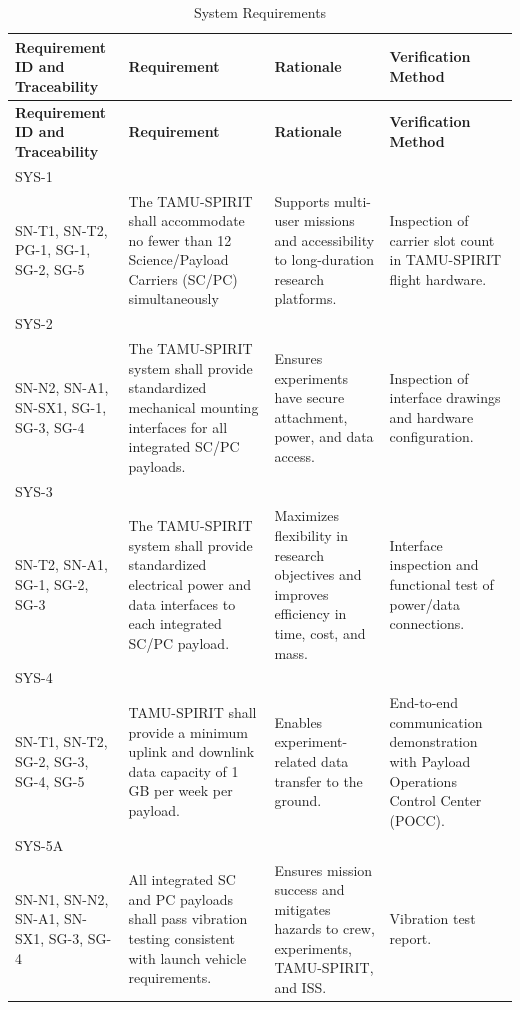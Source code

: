 \documentclass[conf]{new-aiaa}
\begin{document}
{\footnotesize
\setlength{\tabcolsep}{4pt}
\renewcommand{\arraystretch}{1.15}
\begin{longtable}{@{}p{2.2cm}p{4.1cm}p{4.1cm}p{4.1cm}@{}}
\caption{System Requirements}\label{tab:system_level_requirements}\\
\toprule
\textbf{Requirement ID and Traceability} & \textbf{Requirement} & \textbf{Rationale} & \textbf{Verification Method} \\
\midrule
\endfirsthead
\toprule
\textbf{Requirement ID and Traceability} & \textbf{Requirement} & \textbf{Rationale} & \textbf{Verification Method} \\
\midrule
\endhead
\bottomrule
\endfoot

SYS-1\\SN-T1, SN-T2, PG-1, SG-1, SG-2, SG-5 &
The TAMU-SPIRIT shall accommodate no fewer than 12 Science/Payload Carriers (SC/PC) simultaneously &
Supports multi-user missions and accessibility to long-duration research platforms. &
Inspection of carrier slot count in TAMU-SPIRIT flight hardware. \\ \hline

SYS-2\\SN-N2, SN-A1, SN-SX1, SG-1, SG-3, SG-4 &
The TAMU-SPIRIT system shall provide standardized mechanical mounting interfaces for all integrated SC/PC payloads. &
Ensures experiments have secure attachment, power, and data access. &
Inspection of interface drawings and hardware configuration. \\ \hline

SYS-3\\SN-T2, SN-A1, SG-1, SG-2, SG-3 &
The TAMU-SPIRIT system shall provide standardized electrical power and data interfaces to each integrated SC/PC payload. &
Maximizes flexibility in research objectives and improves efficiency in time, cost, and mass. &
Interface inspection and functional test of power/data connections. \\ \hline

SYS-4\\SN-T1, SN-T2, SG-2, SG-3, SG-4, SG-5 &
TAMU-SPIRIT shall provide a minimum uplink and downlink data capacity of 1 GB per week per payload. &
Enables experiment-related data transfer to the ground. &
End-to-end communication demonstration with Payload Operations Control Center (POCC). \\ \hline

SYS-5A\\SN-N1, SN-N2, SN-A1, SN-SX1, SG-3, SG-4 &
All integrated SC and PC payloads shall pass vibration testing consistent with launch vehicle requirements. &
Ensures mission success and mitigates hazards to crew, experiments, TAMU-SPIRIT, and ISS. &
Vibration test report. \\ \hline


\end{longtable}}
\end{document}
